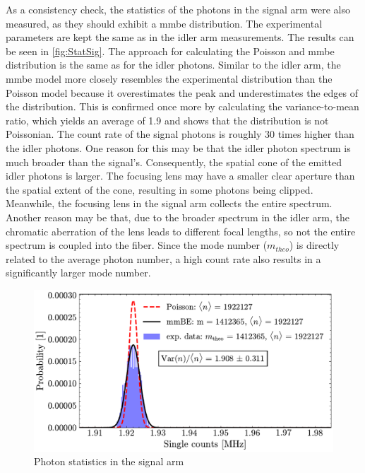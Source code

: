 As a consistency check, the statistics of the photons in the signal arm were also measured, as they should exhibit a \acrshort{mmbe} distribution. The experimental parameters are kept the same as in the idler arm measurements. \newline
The results can be seen in \autoref{fig:StatSig}. The approach for calculating the Poisson and \acrshort{mmbe} distribution is the same as for the idler photons. Similar to the idler arm, the \acrshort{mmbe} model more closely resembles the experimental distribution than the Poisson model because it overestimates the peak and underestimates the edges of the distribution. This is confirmed once more by calculating the variance-to-mean ratio, which yields an average of 1.9 and shows that the distribution is not Poissonian. \newline
The count rate of the signal photons is roughly 30 times higher than the idler photons. One reason for this may be that the idler photon spectrum is much broader than the signal's. Consequently, the spatial cone of the emitted idler photons is larger. The focusing lens may have a smaller clear aperture than the spatial extent of the cone, resulting in some photons being clipped. Meanwhile, the focusing lens in the signal arm collects the entire spectrum. Another reason may be that, due to the broader spectrum in the idler arm, the chromatic aberration of the lens leads to different focal lengths, so not the entire spectrum is coupled into the fiber. \newline
Since the mode number ($m_{theo}$) is directly related to the average photon number, a high count rate also results in a significantly larger mode number.
\begin{figure}[tb!]
	\centering
	\includegraphics[width=.9\textwidth]{Images/SingleStatisticsSignal_2.pdf}
	\caption{Photon statistics in the signal arm}
	\label{fig:StatSig}
\end{figure}

